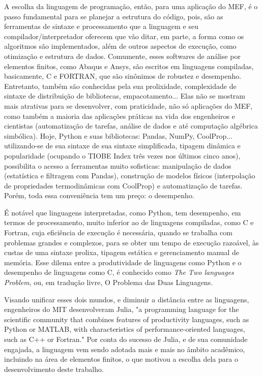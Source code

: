 A escolha da linguagem de programação, então, para uma aplicação do MEF, é o passo fundamental para se planejar a estrutura do código, pois, são as ferramentas de sintaxe e processamento que a linguagem e seu compilador/interpretador oferecem que vão ditar, em parte, a forma como os algoritmos são implementados, além de outros aspectos de execução, como otimização e estrutura de dados. Comumente, esses softwares de análise por elementos finitos, como Abaqus e Ansys, são escritos em linguagens compiladas, basicamente, C e FORTRAN, que são sinônimos de robustez e desempenho. Entretanto, também são conhecidas pela sua prolixidade, complexidade de sintaxe de distribuição de bibliotecas, empacotamento... Elas não se mostram mais atrativas para se desenvolver, com praticidade, não só aplicações do MEF, como também a maioria das aplicações práticas na vida dos engenheiros e cientistas (automatização de tarefas, análise de dados e até computação algébrica simbólica). Hoje, Python e suas bibliotecas: Pandas, NumPy, CoolProp... utilizando-se de sua sintaxe de sua sintaxe simplificada, tipagem dinâmica e popularidade (ocupando o TIOBE Index três vezes nos últimos cinco anos), possibilita o acesso a ferramentas muito sofisticas: manipulação de dados (estatística e filtragem com Pandas), construção de modelos físicos (interpolação de propriedades termodinâmicas com CoolProp) e automatização de tarefas. \cite{ernesti} Porém, toda essa conveniência tem um preço: o desempenho.

É notável que linguagens interpretadas, como Python, tem desempenho, em termos de processamento, muito inferior ao de linguagens compiladas, como C e Fortran, cuja eficiência de execução é necessária, quando se trabalha com problemas grandes e complexos, para se obter um tempo de execução razoável, às custas de uma sintaxe prolixa, tipagem estática e gerenciamento manual de memória. Esse dilema entre a produtividade de linguagens como Python e o desempenho de linguagens como C, é conhecido como \emph{The Two languages Problem}, ou, em tradução livre, O Problema das Duas Linguagens.

Visando unificar esses dois mundos, e diminuir a distância entre as linguagens, engenheiros do MIT desenvolveram Julia, "a programming language for the scientific community that combines features of productivity languages, such as Python or MATLAB, with characteristics of performance-oriented languages, such as C++ or Fortran." \cite[tradução livre]{Bezanson} Por conta do sucesso de Julia, e de sua comunidade engajada, a linguagem vem sendo adotada mais e mais no âmbito acadêmico, incluindo na área de elementos finitos, o que motivou a escolha dela para o desenvolvimento deste trabalho.

